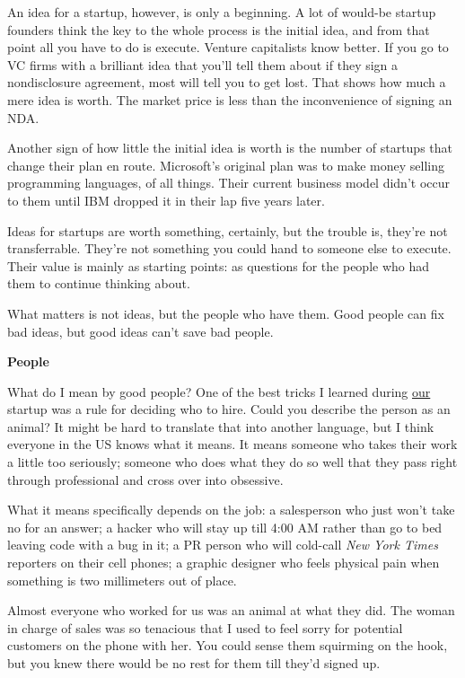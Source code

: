 \documentclass[12pt]{book}
\begin{document}
An idea for a startup, however, is only a beginning. A lot of would-be
startup founders think the key to the whole process is the initial idea,
and from that point all you have to do is execute. Venture capitalists
know better. If you go to VC firms with a brilliant idea that you'll
tell them about if they sign a nondisclosure agreement, most will tell
you to get lost. That shows how much a mere idea is worth. The market
price is less than the inconvenience of signing an NDA.

Another sign of how little the initial idea is worth is the number of
startups that change their plan en route. Microsoft's original plan was
to make money selling programming languages, of all things. Their
current business model didn't occur to them until IBM dropped it in
their lap five years later.

Ideas for startups are worth something, certainly, but the trouble is,
they're not transferrable. They're not something you could hand to
someone else to execute. Their value is mainly as starting points: as
questions for the people who had them to continue thinking about.

What matters is not ideas, but the people who have them. Good people can
fix bad ideas, but good ideas can't save bad people.

\textbf{People}

What do I mean by good people? One of the best tricks I learned during
\href{road.html}{our} startup was a rule for deciding who to hire. Could
you describe the person as an animal? It might be hard to translate that
into another language, but I think everyone in the US knows what it
means. It means someone who takes their work a little too seriously;
someone who does what they do so well that they pass right through
professional and cross over into obsessive.

What it means specifically depends on the job: a salesperson who just
won't take no for an answer; a hacker who will stay up till 4:00 AM
rather than go to bed leaving code with a bug in it; a PR person who
will cold-call \emph{New York Times} reporters on their cell phones; a
graphic designer who feels physical pain when something is two
millimeters out of place.

Almost everyone who worked for us was an animal at what they did. The
woman in charge of sales was so tenacious that I used to feel sorry for
potential customers on the phone with her. You could sense them
squirming on the hook, but you knew there would be no rest for them till
they'd signed up.
\end{document}
